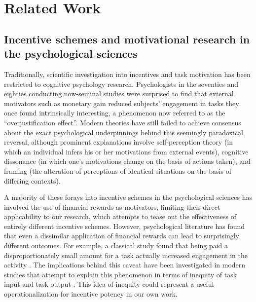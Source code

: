 \section{Related Work}

\subsection{Incentive schemes and motivational research in the psychological sciences}
Traditionally, scientific investigation into incentives and task motivation has been restricted to cognitive psychology research. Psychologists in the seventies and eighties conducting now-seminal studies were surprised to find that external motivators such as monetary gain reduced subjects’ engagement in tasks they once found intrinsically interesting, a phenomenon now referred to as the “overjustification effect”\cite{Lepper73}. Modern theories have still failed to achieve consensus about the exact psychological underpinnings behind this seemingly paradoxical reversal, although prominent explanations involve self-perception theory (in which an individual infers his or her motivations from external events), cognitive dissonance (in which one’s motivations change on the basis of actions taken), and framing (the alteration of perceptions of identical situations on the basis of differing contexts).

A majority of these forays into incentive schemes in the psychological sciences has involved the use of financial rewards as motivators, limiting their direct applicability to our research, which attempts to tease out the effectiveness of entirely different incentive schemes. However, psychological literature has found that even a dissimilar application of financial rewards can lead to surprisingly different outcomes. For example, a classical study found that being paid a disproportionately small amount for a task actually increased engagement in the activity \cite{Rosenfield80}. The implications behind this caveat have been investigated in modern studies that attempt to explain this phenomenon in terms of inequity of task input and task output \cite{Ryan00}. This idea of inequity could represent a useful operationalization for incentive potency in our own work.

